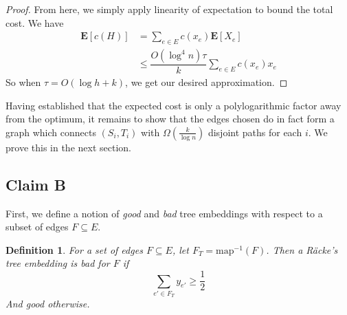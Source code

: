 \documentclass[12pt]{article}
\newtheorem{definition}{Definition}
\begin{document}
\begin{proof}
From here, we simply apply linearity of expectation to bound the total cost. We have 
%
%
\begin{align}
\textbf{E}[c(H)] &= \sum_{e \in E} c(x_e)\textbf{E}[X_e] \\
                 &\leq \dfrac{O(\log^4 n)\tau}{k} \sum_{e \in E} c(x_e) x_e
\end{align}
So when $\tau = O(\log h + k)$, we get our desired approximation.
\end{proof}
%

Having established that the expected cost is only a polylogarithmic factor away from the optimum, it remains to show that the edges chosen do in fact form a graph which connects $(S_i, T_i)$ with $\Omega(\frac{k}{\log n})$ disjoint paths for each $i$. We prove this in the next section.

\subsection{Claim B}

First, we define a notion of \emph{good} and \emph{bad} tree embeddings with respect to a subset of edges $F \subseteq E$.


\begin{definition}
For a set of edges $F \subseteq E$, let $F_T = \text{map}^{-1}(F)$. Then a R\"{a}cke's tree embedding is bad for $F$ if 
\[ \sum_{e' \in F_T} y_{e'} \geq \frac{1}{2} \]
And good otherwise.
\end{definition}
\end{document}
